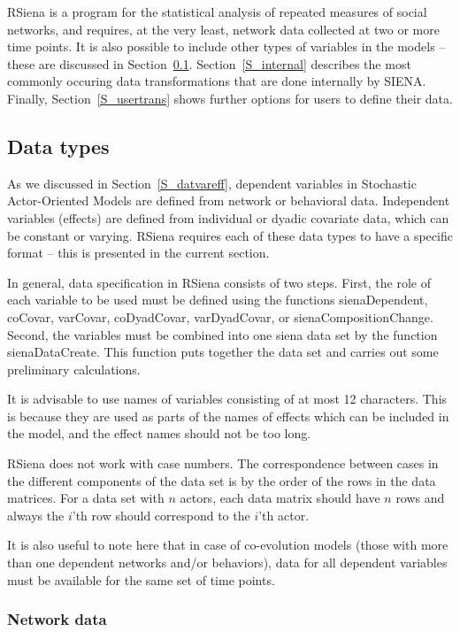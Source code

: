 \documentclass[a4paper,fleqn,11pt]{article}
\newcommand{\+}{\, + \,}
\newcommand{\sfn}[1]{\textsf{#1}}
\newcommand{\RS}{{\sf \textsf{RSiena} }}
\newcommand{\si}{{\sf SIENA}}
\newcommand{\saom}{{Stochastic Actor-Oriented Model}}
\begin{document}
\RS is a program for the statistical analysis
of repeated measures of social networks, and requires, at the very
least, network data collected at two or more time points. It is also possible
to include other types of variables in the models -- these are discussed in
Section~\ref{S_datatypes}. Section~\ref{S_internal} describes the most
commonly occuring
data transformations that are done internally by \si.
Finally, Section~\ref{S_usertrans}
shows further options for users to define their data.


\subsection{Data types}
\label{S_datatypes}

As we discussed in Section~\ref{S_datvareff}, dependent variables in {\saom}s are defined from
network or behavioral data. Independent variables (effects) are defined
from individual or dyadic covariate data, which can be constant or varying.
\RS requires each of these data types to have a specific format -- this is
presented in the current section.

In general, data specification in \RS consists of two steps.
First, the role of each variable to be used must be defined using
the functions \sfn{sienaDependent}, \sfn{coCovar}, \sfn{varCovar},
\sfn{coDyadCovar}, \sfn{varDyadCovar}, or \sfn{sienaCompositionChange}.
Second, the variables must be combined into one \sfn{siena} data set by the function
\sfn{sienaDataCreate}.
This function puts together the data set and carries out some
preliminary calculations.

It is advisable to use names of variables
consisting of at most 12 characters. This is because they are used as parts
of the names of effects which can be included in the model, and the effect
names should not be too long.

\RS does not work with case numbers. The correspondence between cases
in the different components of the data set is by the order of the rows
in the data matrices. For a data set with $n$ actors,
each data matrix should have $n$ rows and always the $i$'th row
should correspond to the $i$'th actor.

It is also useful to note here that in case of co-evolution models (those with
more than one dependent networks and/or behaviors), data for all dependent
variables must be available for the same set of time points.


\subsubsection{Network data}
\end{document}
